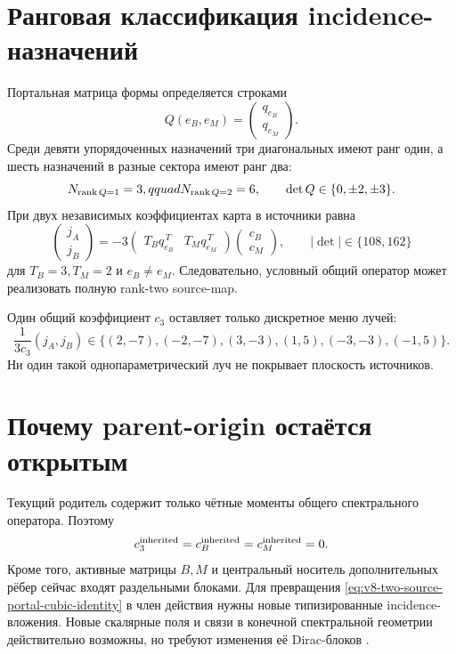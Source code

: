\section{Ранговая классификация incidence-назначений}

Портальная матрица формы определяется строками
\begin{equation}
 Q(e_B,e_M)=\begin{pmatrix}q_{e_B}\\q_{e_M}\end{pmatrix}.
 \label{eq:v8-two-source-portal-incidence-matrix}
\end{equation}
Среди девяти упорядоченных назначений три диагональных имеют ранг один, а
шесть назначений в разные сектора имеют ранг два:
\begin{equation}
 N_{\operatorname{rank} Q=1}=3,qquad N_{\operatorname{rank} Q=2}=6,
 \qquad \det Q\in\{0,\pm2,\pm3\}.
 \label{eq:v8-two-source-portal-rank-menu}
\end{equation}
При двух независимых коэффициентах карта в источники равна
\begin{equation}
 \begin{pmatrix}j_A\\j_B\end{pmatrix}
 =-3\begin{pmatrix}T_Bq_{e_B}^{\,T}&T_Mq_{e_M}^{\,T}\end{pmatrix}
 \begin{pmatrix}c_B\\c_M\end{pmatrix},
 \qquad
 |\det|\in\{108,162\}
 \label{eq:v8-two-source-portal-two-coefficient-map}
\end{equation}
для $T_B=3,T_M=2$ и $e_B\ne e_M$. Следовательно, условный общий оператор
может реализовать полную rank-two source-map.

Один общий коэффициент $c_3$ оставляет только дискретное меню лучей:
\begin{equation}
 \frac1{3c_3}(j_A,j_B)
 \in\{(2,-7),(-2,-7),(3,-3),(1,5),(-3,-3),(-1,5)\}.
 \label{eq:v8-two-source-portal-single-coefficient-rays}
\end{equation}
Ни один такой однопараметрический луч не покрывает плоскость источников.

\section{Почему parent-origin остаётся открытым}

Текущий родитель содержит только чётные моменты общего спектрального
оператора. Поэтому
\begin{equation}
 c_3^{\rm inherited}=c_B^{\rm inherited}=c_M^{\rm inherited}=0.
 \label{eq:v8-two-source-portal-odd-coefficients-zero}
\end{equation}
Кроме того, активные матрицы $B,M$ и центральный носитель дополнительных
рёбер сейчас входят раздельными блоками. Для превращения
\eqref{eq:v8-two-source-portal-cubic-identity} в член действия нужны новые
типизированные incidence-вложения. Новые скалярные поля и связи в конечной
спектральной геометрии действительно возможны, но требуют изменения её
Dirac-блоков \cite{v8-two-source-portal-stephan}.

